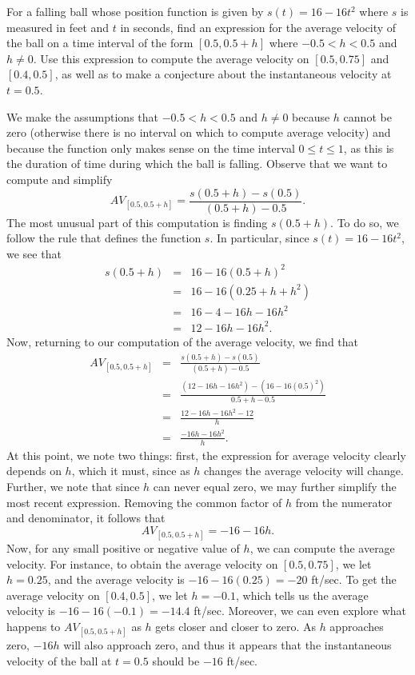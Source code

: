 \begin{example}
For a falling ball whose position function is given by \newline $s(t) = 16 - 16t^2$ where $s$ is measured in feet and $t$ in seconds, find an expression for the average velocity of the ball on a time interval of the form $[0.5, 0.5+h]$ where $-0.5 < h < 0.5$ and $h \ne 0$.  Use this expression to compute the average velocity on $[0.5,0.75]$ and $[0.4,0.5]$, as well as to make a conjecture about the instantaneous velocity at $t = 0.5$.

\solution We make the assumptions that $-0.5 < h < 0.5$ and $h \ne 0$ because $h$ cannot be zero (otherwise there is no interval on which to compute average velocity) and because the function only makes sense on the time interval $0 \le t \le 1$, as this is the duration of time during which the ball is falling.  Observe that we want to compute and simplify $$AV_{[0.5, 0.5+h]} = \frac{s(0.5+h) - s(0.5)}{(0.5+h) - 0.5}.$$  The most unusual part of this computation is finding $s(0.5+h)$.  To do so, we follow the rule that defines the function $s$.  In particular, since $s(t) = 16-16t^2$, we see that 
\begin{eqnarray*}
s(0.5+h) & = & 16 - 16(0.5 + h)^2 \\
& = & 16 - 16(0.25 + h + h^2) \\
& = & 16 - 4 - 16h - 16h^2 \\
& = & 12 - 16h - 16h^2.
\end{eqnarray*}
Now, returning to our computation of the average velocity, we find that 
\begin{eqnarray*}
 AV_{[0.5, 0.5+h]} & = & \frac{s(0.5+h) - s(0.5)}{(0.5+h) - 0.5} \\
& = & \frac{(12 - 16h - 16h^2) - (16 - 16(0.5)^2)}{0.5 + h - 0.5} \\
& = & \frac{12 - 16h - 16h^2 - 12}{h} \\
& = & \frac{-16h - 16h^2}{h}.
\end{eqnarray*}
At this point, we note two things:  first, the expression for average velocity clearly depends on $h$, which it must, since as $h$ changes the average velocity will change.  Further, we note that since $h$ can never equal zero, we may further simplify the most recent expression.  Removing the common factor of $h$ from the numerator and denominator, it follows that
$$ AV_{[0.5, 0.5+h]} = -16 - 16h.$$
Now, for any small positive or negative value of $h$, we can compute the average velocity.  For instance, to obtain the average velocity on $[0.5,0.75]$, we let $h = 0.25$, and the average velocity is $-16 - 16(0.25) = -20$ ft/sec.  To get the average velocity on $[0.4, 0.5]$, we let $h = -0.1$, which tells us the average velocity is $-16 - 16(-0.1) = -14.4$ ft/sec.  Moreover, we can even explore what happens to $AV_{[0.5, 0.5+h]}$ as $h$ gets closer and closer to zero.  As $h$ approaches zero, $-16h$ will also approach zero, and thus it appears that the instantaneous velocity of the ball at $t = 0.5$ should be $-16$ ft/sec.
\end{example}